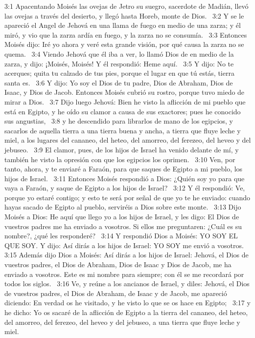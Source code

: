 3:1 Apacentando Moisés las ovejas de Jetro su suegro, sacerdote de Madián, llevó las ovejas a través del desierto, y llegó hasta Horeb, monte de Dios.  
3:2 Y se le apareció el Angel de Jehová en una llama de fuego en medio de una zarza; y él miró, y vio que la zarza ardía en fuego, y la zarza no se consumía.  
3:3 Entonces Moisés dijo: Iré yo ahora y veré esta grande visión, por qué causa la zarza no se quema.  
3:4 Viendo Jehová que él iba a ver, lo llamó Dios de en medio de la zarza, y dijo: ¡Moisés, Moisés! Y él respondió: Heme aquí.  
3:5 Y dijo: No te acerques; quita tu calzado de tus pies, porque el lugar en que tú estás, tierra santa es.  
3:6 Y dijo: Yo soy el Dios de tu padre, Dios de Abraham, Dios de Isaac, y Dios de Jacob. Entonces Moisés cubrió su rostro, porque tuvo miedo de mirar a Dios.  
3:7 Dijo luego Jehová: Bien he visto la aflicción de mi pueblo que está en Egipto, y he oído su clamor a causa de sus exactores; pues he conocido sus angustias,  
3:8 y he descendido para librarlos de mano de los egipcios, y sacarlos de aquella tierra a una tierra buena y ancha, a tierra que fluye leche y miel, a los lugares del cananeo, del heteo, del amorreo, del ferezeo, del heveo y del jebuseo.  
3:9 El clamor, pues, de los hijos de Israel ha venido delante de mí, y también he visto la opresión con que los egipcios los oprimen.  
3:10 Ven, por tanto, ahora, y te enviaré a Faraón, para que saques de Egipto a mi pueblo, los hijos de Israel.  
3:11 Entonces Moisés respondió a Dios: ¿Quién soy yo para que vaya a Faraón, y saque de Egipto a los hijos de Israel?  
3:12 Y él respondió: Ve, porque yo estaré contigo; y esto te será por señal de que yo te he enviado: cuando hayas sacado de Egipto al pueblo, serviréis a Dios sobre este monte.  
3:13 Dijo Moisés a Dios: He aquí que llego yo a los hijos de Israel, y les digo: El Dios de vuestros padres me ha enviado a vosotros. Si ellos me preguntaren: ¿Cuál es su nombre?, ¿qué les responderé?  
3:14 Y respondió Dios a Moisés: YO SOY EL QUE SOY. Y dijo: Así dirás a los hijos de Israel: YO SOY me envió a vosotros.  
3:15 Además dijo Dios a Moisés: Así dirás a los hijos de Israel: Jehová, el Dios de vuestros padres, el Dios de Abraham, Dios de Isaac y Dios de Jacob, me ha enviado a vosotros. Este es mi nombre para siempre; con él se me recordará por todos los siglos.  
3:16 Ve, y reúne a los ancianos de Israel, y diles: Jehová, el Dios de vuestros padres, el Dios de Abraham, de Isaac y de Jacob, me apareció diciendo: En verdad os he visitado, y he visto lo que se os hace en Egipto;  
3:17 y he dicho: Yo os sacaré de la aflicción de Egipto a la tierra del cananeo, del heteo, del amorreo, del ferezeo, del heveo y del jebuseo, a una tierra que fluye leche y miel.  
